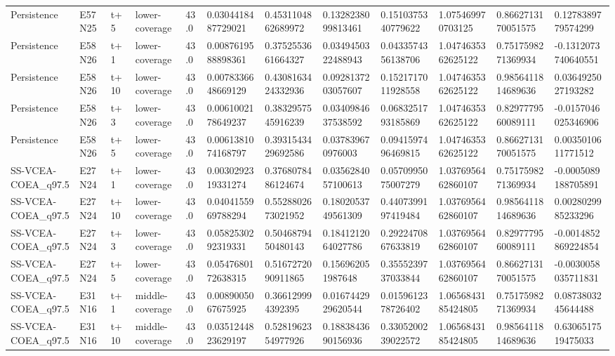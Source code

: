 \begin{landscape}
\begin{longtable}{llllllllllll}
Persistence & E57N25 & t+5 & lower-coverage & 43.0 & 0.0304418487729021 & 0.4531104862689972 & 0.1328238099813461 & 0.1510375340779622 & 1.075469970703125 & 0.8662713170051575 & 0.1278389779574299 \\
Persistence & E58N26 & t+1 & lower-coverage & 43.0 & 0.0087619588898361 & 0.3752553661664327 & 0.0349450322488943 & 0.0433574356138706 & 1.0474635362625122 & 0.7517598271369934 & -0.1312073740640551 \\
Persistence & E58N26 & t+10 & lower-coverage & 43.0 & 0.0078336648669129 & 0.4308163424332936 & 0.0928137203057607 & 0.1521717011928558 & 1.0474635362625122 & 0.9856411814689636 & 0.0364925027193282 \\
Persistence & E58N26 & t+3 & lower-coverage & 43.0 & 0.0061002178649237 & 0.3832957545916239 & 0.0340984637538592 & 0.0683251793185869 & 1.0474635362625122 & 0.8297779560089111 & -0.0157046025346906 \\
Persistence & E58N26 & t+5 & lower-coverage & 43.0 & 0.0061381074168797 & 0.3931543429692586 & 0.037839670976003 & 0.0941597496469815 & 1.0474635362625122 & 0.8662713170051575 & 0.0035010611771512 \\
SS-VCEA-COEA\_q97.5 & E27N24 & t+1 & lower-coverage & 43.0 & 0.0030292319331274 & 0.3768078486124674 & 0.0356284057100613 & 0.0570995075007279 & 1.0376956462860107 & 0.7517598271369934 & -0.0005089188705891 \\
SS-VCEA-COEA\_q97.5 & E27N24 & t+10 & lower-coverage & 43.0 & 0.0404155969788294 & 0.5528802673021952 & 0.1802053749561309 & 0.4407399197419484 & 1.0376956462860107 & 0.9856411814689636 & 0.0028029985233296 \\
SS-VCEA-COEA\_q97.5 & E27N24 & t+3 & lower-coverage & 43.0 & 0.0582530292319331 & 0.5046879450480143 & 0.1841212064027786 & 0.2922470867633819 & 1.0376956462860107 & 0.8297779560089111 & -0.0014852869224854 \\
SS-VCEA-COEA\_q97.5 & E27N24 & t+5 & lower-coverage & 43.0 & 0.0547680172638315 & 0.5167272090911865 & 0.156962051987648 & 0.3555239737033844 & 1.0376956462860107 & 0.8662713170051575 & -0.0030058035711831 \\
SS-VCEA-COEA\_q97.5 & E31N16 & t+1 & middle-coverage & 43.0 & 0.0089005067675925 & 0.366129994392395 & 0.0167442929620544 & 0.0159612378726402 & 1.0656843185424805 & 0.7517598271369934 & 0.0873803245644488 \\
SS-VCEA-COEA\_q97.5 & E31N16 & t+10 & middle-coverage & 43.0 & 0.0351244823629197 & 0.5281962354977926 & 0.1883843690156936 & 0.3305200239022572 & 1.0656843185424805 & 0.9856411814689636 & 0.6306517519475033 \\

\end{longtable}
\end{landscape}
